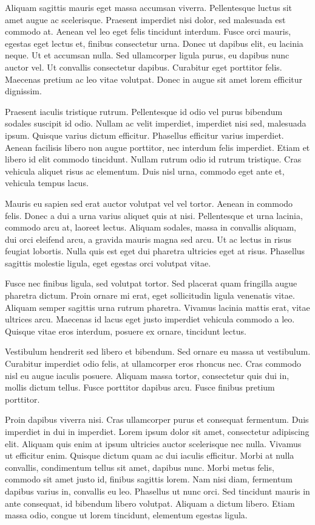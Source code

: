 Aliquam sagittis mauris eget massa accumsan viverra. Pellentesque luctus sit amet augue ac scelerisque. Praesent imperdiet nisi dolor, sed malesuada est commodo at. Aenean vel leo eget felis tincidunt interdum. Fusce orci mauris, egestas eget lectus et, finibus consectetur urna. Donec ut dapibus elit, eu lacinia neque. Ut et accumsan nulla. Sed ullamcorper ligula purus, eu dapibus nunc auctor vel. Ut convallis consectetur dapibus. Curabitur eget porttitor felis. Maecenas pretium ac leo vitae volutpat. Donec in augue sit amet lorem efficitur dignissim.

Praesent iaculis tristique rutrum. Pellentesque id odio vel purus bibendum sodales suscipit id odio. Nullam ac velit imperdiet, imperdiet nisi sed, malesuada ipsum. Quisque varius dictum efficitur. Phasellus efficitur varius imperdiet. Aenean facilisis libero non augue porttitor, nec interdum felis imperdiet. Etiam et libero id elit commodo tincidunt. Nullam rutrum odio id rutrum tristique. Cras vehicula aliquet risus ac elementum. Duis nisl urna, commodo eget ante et, vehicula tempus lacus.

Mauris eu sapien sed erat auctor volutpat vel vel tortor. Aenean in commodo felis. Donec a dui a urna varius aliquet quis at nisi. Pellentesque et urna lacinia, commodo arcu at, laoreet lectus. Aliquam sodales, massa in convallis aliquam, dui orci eleifend arcu, a gravida mauris magna sed arcu. Ut ac lectus in risus feugiat lobortis. Nulla quis est eget dui pharetra ultricies eget at risus. Phasellus sagittis molestie ligula, eget egestas orci volutpat vitae.

Fusce nec finibus ligula, sed volutpat tortor. Sed placerat quam fringilla augue pharetra dictum. Proin ornare mi erat, eget sollicitudin ligula venenatis vitae. Aliquam semper sagittis urna rutrum pharetra. Vivamus lacinia mattis erat, vitae ultrices arcu. Maecenas id lacus eget justo imperdiet vehicula commodo a leo. Quisque vitae eros interdum, posuere ex ornare, tincidunt lectus.

Vestibulum hendrerit sed libero et bibendum. Sed ornare eu massa ut vestibulum. Curabitur imperdiet odio felis, at ullamcorper eros rhoncus nec. Cras commodo nisl eu augue iaculis posuere. Aliquam massa tortor, consectetur quis dui in, mollis dictum tellus. Fusce porttitor dapibus arcu. Fusce finibus pretium porttitor.

Proin dapibus viverra nisi. Cras ullamcorper purus et consequat fermentum. Duis imperdiet in dui in imperdiet. Lorem ipsum dolor sit amet, consectetur adipiscing elit. Aliquam quis enim at ipsum ultricies auctor scelerisque nec nulla. Vivamus ut efficitur enim. Quisque dictum quam ac dui iaculis efficitur. Morbi at nulla convallis, condimentum tellus sit amet, dapibus nunc. Morbi metus felis, commodo sit amet justo id, finibus sagittis lorem. Nam nisi diam, fermentum dapibus varius in, convallis eu leo. Phasellus ut nunc orci. Sed tincidunt mauris in ante consequat, id bibendum libero volutpat. Aliquam a dictum libero. Etiam massa odio, congue ut lorem tincidunt, elementum egestas ligula.

